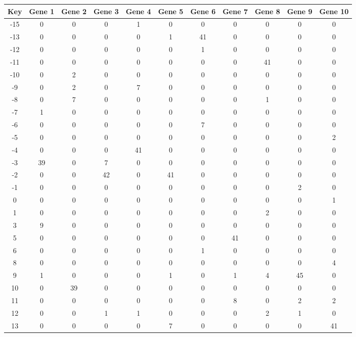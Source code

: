 \begin{tabular}{|c|c|c|c|c|c|c|c|c|c|c|}
\hline
Key & Gene 1 & Gene 2 & Gene 3 & Gene 4 & Gene 5 & Gene 6 & Gene 7 & Gene 8 & Gene 9 & Gene 10 \\
\hline
-15 & 0 & 0 & 0 & 1 & 0 & 0 & 0 & 0 & 0 & 0 \\
-13 & 0 & 0 & 0 & 0 & 1 & 41 & 0 & 0 & 0 & 0 \\
-12 & 0 & 0 & 0 & 0 & 0 & 1 & 0 & 0 & 0 & 0 \\
-11 & 0 & 0 & 0 & 0 & 0 & 0 & 0 & 41 & 0 & 0 \\
-10 & 0 & 2 & 0 & 0 & 0 & 0 & 0 & 0 & 0 & 0 \\
-9 & 0 & 2 & 0 & 7 & 0 & 0 & 0 & 0 & 0 & 0 \\
-8 & 0 & 7 & 0 & 0 & 0 & 0 & 0 & 1 & 0 & 0 \\
-7 & 1 & 0 & 0 & 0 & 0 & 0 & 0 & 0 & 0 & 0 \\
-6 & 0 & 0 & 0 & 0 & 0 & 7 & 0 & 0 & 0 & 0 \\
-5 & 0 & 0 & 0 & 0 & 0 & 0 & 0 & 0 & 0 & 2 \\
-4 & 0 & 0 & 0 & 41 & 0 & 0 & 0 & 0 & 0 & 0 \\
-3 & 39 & 0 & 7 & 0 & 0 & 0 & 0 & 0 & 0 & 0 \\
-2 & 0 & 0 & 42 & 0 & 41 & 0 & 0 & 0 & 0 & 0 \\
-1 & 0 & 0 & 0 & 0 & 0 & 0 & 0 & 0 & 2 & 0 \\
0 & 0 & 0 & 0 & 0 & 0 & 0 & 0 & 0 & 0 & 1 \\
1 & 0 & 0 & 0 & 0 & 0 & 0 & 0 & 2 & 0 & 0 \\
3 & 9 & 0 & 0 & 0 & 0 & 0 & 0 & 0 & 0 & 0 \\
5 & 0 & 0 & 0 & 0 & 0 & 0 & 41 & 0 & 0 & 0 \\
6 & 0 & 0 & 0 & 0 & 0 & 1 & 0 & 0 & 0 & 0 \\
8 & 0 & 0 & 0 & 0 & 0 & 0 & 0 & 0 & 0 & 4 \\
9 & 1 & 0 & 0 & 0 & 1 & 0 & 1 & 4 & 45 & 0 \\
10 & 0 & 39 & 0 & 0 & 0 & 0 & 0 & 0 & 0 & 0 \\
11 & 0 & 0 & 0 & 0 & 0 & 0 & 8 & 0 & 2 & 2 \\
12 & 0 & 0 & 1 & 1 & 0 & 0 & 0 & 2 & 1 & 0 \\
13 & 0 & 0 & 0 & 0 & 7 & 0 & 0 & 0 & 0 & 41 \\
\hline
\end{tabular}